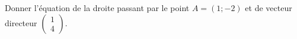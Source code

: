 
\begin{exercice}\label{exosmath-0153}

    Donner l'équation de la droite passant par le point \( A=(1;-2)\) et de vecteur directeur \( \begin{pmatrix}
        1    \\ 
        4    
    \end{pmatrix}\).

\end{exercice}
